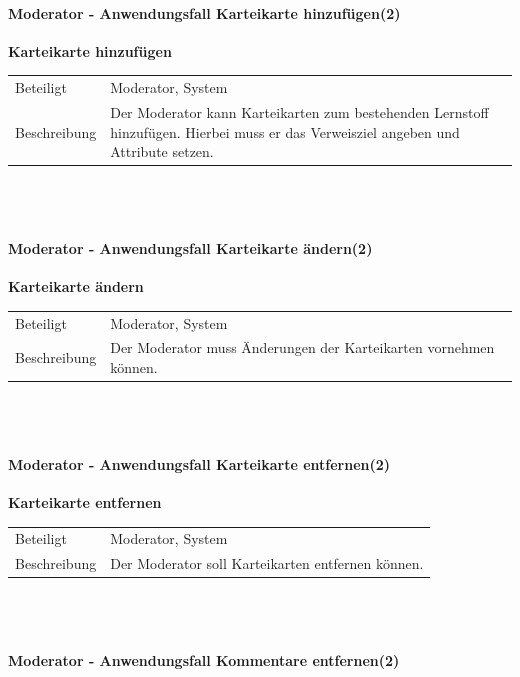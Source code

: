 \documentclass[12pt,a4paper]{article}
\begin{document}
{\paragraph{Moderator - Anwendungsfall \glqq Karteikarte hinzufügen\grqq (2)}\mbox{}

\textbf{Karteikarte hinzufügen}\\
\begin{tabular}{l|p{12cm}}
\hline 
Beteiligt & Moderator, System \\ 
Beschreibung & Der Moderator kann Karteikarten zum bestehenden Lernstoff hinzufügen. Hierbei muss er das Verweisziel angeben und Attribute setzen. \\ 
\end{tabular}\\\\

\paragraph{Moderator - Anwendungsfall \glqq Karteikarte ändern\grqq (2)}\mbox{}

\textbf{Karteikarte ändern}\\
\begin{tabular}{l|p{12cm}}
\hline 
Beteiligt & Moderator, System \\ 
Beschreibung & Der Moderator muss Änderungen der Karteikarten vornehmen können. \\ 
\end{tabular}\\\\

\newpage

\paragraph{Moderator - Anwendungsfall \glqq Karteikarte entfernen\grqq (2)}\mbox{}

\textbf{Karteikarte entfernen}\\
\begin{tabular}{l|p{12cm}}
\hline 
Beteiligt & Moderator, System \\ 
Beschreibung & Der Moderator soll Karteikarten entfernen können. \\ 
\end{tabular}\\\\


\paragraph{Moderator - Anwendungsfall \glqq Kommentare entfernen\grqq (2)}\mbox{}

}
\end{document}
